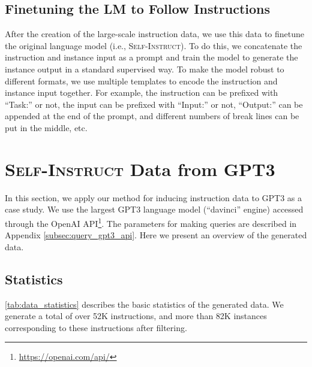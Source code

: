 \documentclass[11pt]{article}
\newcommand{\nascomment}[1]{\textcolor{blue}{\textbf{[#1 -- \textsc{nas}]}}}
\newcommand{\name}{\textsc{Self-Instruct}}
\newcommand{\gptthree}{\textsc{GPT3}}
\begin{document}
\subsection{Finetuning the LM to Follow Instructions}
\label{subsec:instruction-tuning}
After the creation of the large-scale instruction data, we use this data to finetune the original language model (i.e., \name{}). To do this, we concatenate the instruction and instance input as a prompt and train the model to generate the instance output in a standard supervised way. To make the model robust to different formats, we use multiple templates to encode the instruction and instance input together. For example, the instruction can be prefixed with ``Task:'' or not, the input can be prefixed with ``Input:'' or not, ``Output:'' can be appended at the end of the prompt, and different numbers of break lines can be put in the middle, etc.




\section{\name{} Data from \gptthree{}}
\label{sec:generatd-data}

In this section, we apply our method for inducing instruction data to \gptthree{} as a case study. We use the largest GPT3 language model (``davinci'' engine) accessed through the OpenAI API\footnote{\url{https://openai.com/api/}}. The parameters for making queries are described in Appendix \ref{subsec:query_gpt3_api}. Here we present an overview of the generated data.

\subsection{Statistics}
\label{subsec:statistics}

\autoref{tab:data_statistics} describes the basic statistics of the generated data. We generate a total of over 52K instructions, and more than 82K instances corresponding to these instructions after filtering.

\end{document}
